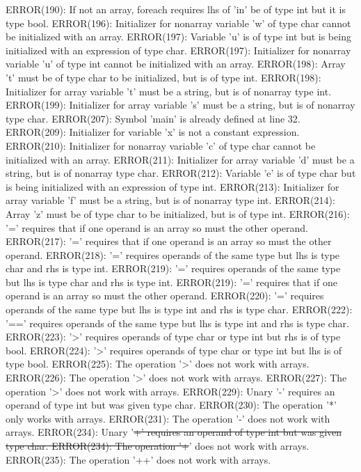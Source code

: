 \documentclass[12pt]{book}
\begin{document}
ERROR(190): If not an array, foreach requires lhs of 'in' be of type int but it is type bool.
ERROR(196): Initializer for nonarray variable 'w' of type char cannot be initialized with an array.
ERROR(197): Variable 'u' is of type int but is being initialized with an expression of type char.
ERROR(197): Initializer for nonarray variable 'u' of type int cannot be initialized with an array.
ERROR(198): Array 't' must be of type char to be initialized, but is of type int.
ERROR(198): Initializer for array variable 't' must be a string, but is of nonarray type int.
ERROR(199): Initializer for array variable 's' must be a string, but is of nonarray type char.
ERROR(207): Symbol 'main' is already defined at line 32.
ERROR(209): Initializer for variable 'x' is not a constant expression.
ERROR(210): Initializer for nonarray variable 'c' of type char cannot be initialized with an array.
ERROR(211): Initializer for array variable 'd' must be a string, but is of nonarray type char.
ERROR(212): Variable 'e' is of type char but is being initialized with an expression of type int.
ERROR(213): Initializer for array variable 'f' must be a string, but is of nonarray type int.
ERROR(214): Array 'z' must be of type char to be initialized, but is of type int.
ERROR(216): '=' requires that if one operand is an array so must the other operand.
ERROR(217): '=' requires that if one operand is an array so must the other operand.
ERROR(218): '=' requires operands of the same type but lhs is type char and rhs is type int.
ERROR(219): '=' requires operands of the same type but lhs is type char and rhs is type int.
ERROR(219): '=' requires that if one operand is an array so must the other operand.
ERROR(220): '=' requires operands of the same type but lhs is type int and rhs is type char.
ERROR(222): '==' requires operands of the same type but lhs is type int and rhs is type char.
ERROR(223): '>' requires operands of type char or type int but rhs is of type bool.
ERROR(224): '>' requires operands of type char or type int but lhs is of type bool.
ERROR(225): The operation '>' does not work with arrays.
ERROR(226): The operation '>' does not work with arrays.
ERROR(227): The operation '>' does not work with arrays.
ERROR(229): Unary '-' requires an operand of type int but was given type char.
ERROR(230): The operation '*' only works with arrays.
ERROR(231): The operation '-' does not work with arrays.
ERROR(234): Unary '\sout{+' requires an operand of type int but was given type char.
ERROR(234): The operation '+}' does not work with arrays.
ERROR(235): The operation '++' does not work with arrays.
\end{document}
